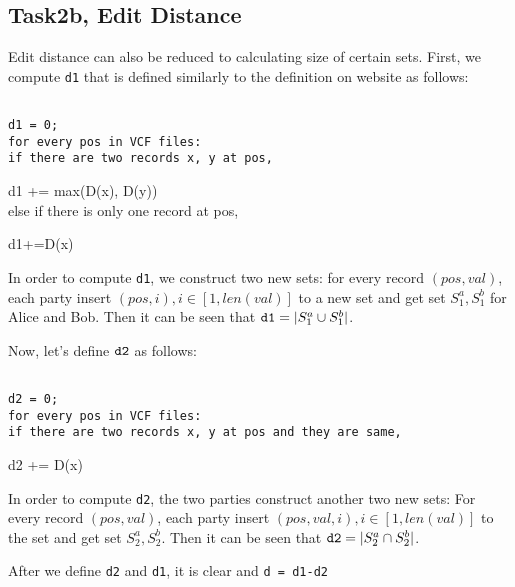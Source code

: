 \subsection{Task2b, Edit Distance}
Edit distance can also be reduced to calculating size of certain sets. First, we compute {\tt d1} that is defined similarly to the definition on website as follows:\\
\begin{framed}
{\tt~\\
d1 = 0;\\
for every pos in VCF files:\\
if there are two records x, y at pos,

d1 += max(D(x), D(y))\\
else if there is only one record at pos,

d1+=D(x)\\}
\end{framed}

In order to compute {\tt d1}, we construct two new sets: for every record $(pos, val)$, each party insert $(pos, i), i\in[1, len(val)]$ to a new set and get set $S_1^a, S_1^b$ for Alice and Bob. Then it 
can be seen that ${\tt d1} = |S_1^a\cup S_1^b|$.

Now, let's define ${\tt d2}$ as follows:
\begin{framed}
{\tt~\\
d2 = 0;\\
for every pos in VCF files:\\
if there are two records x, y at pos and they are same,

d2 += D(x)\\}
\end{framed}
In order to compute {\tt d2}, the two parties construct another two new sets: For every record $(pos, val)$, each party insert $(pos,val, i), i\in[1, len(val)]$ to the set and get set $S_2^a, S_2^b$. Then it 
can be seen that ${\tt d2} = |S_2^a\cap S_2^b|$.

After we define {\tt d2} and {\tt d1}, it is clear and {\tt d = d1-d2}
